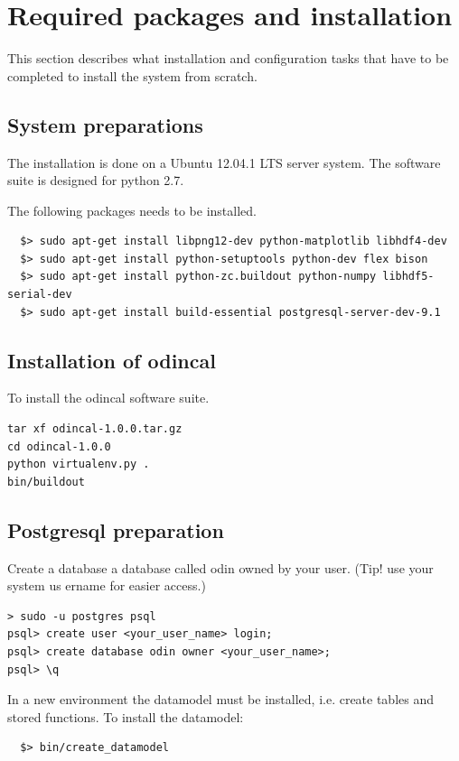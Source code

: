 \documentclass[12pt]{article}
\begin{document}
\section{Required packages and installation}
This section describes what installation and configuration tasks that have to be completed to install the system from scratch.
\subsection{System preparations}
The installation is done on a Ubuntu 12.04.1 LTS server system. The software suite is designed for python 2.7.

The following packages needs to be installed.
\begin{verbatim}  
  $> sudo apt-get install libpng12-dev python-matplotlib libhdf4-dev
  $> sudo apt-get install python-setuptools python-dev flex bison
  $> sudo apt-get install python-zc.buildout python-numpy libhdf5-serial-dev
  $> sudo apt-get install build-essential postgresql-server-dev-9.1
\end{verbatim}


\subsection{Installation of odincal}

To install the odincal software suite. 

\begin{verbatim}
tar xf odincal-1.0.0.tar.gz
cd odincal-1.0.0
python virtualenv.py .
bin/buildout
\end{verbatim}


\subsection{Postgresql preparation}
Create a database a database called odin owned by your user. (Tip! use your system us
ername for easier access.)
 
\begin{verbatim}  
> sudo -u postgres psql
psql> create user <your_user_name> login;
psql> create database odin owner <your_user_name>;
psql> \q
\end{verbatim}

In a new environment the datamodel must be installed, i.e. create tables and stored functions. To install the datamodel:

\begin{verbatim}  
  $> bin/create_datamodel
\end{verbatim}
\end{document}
